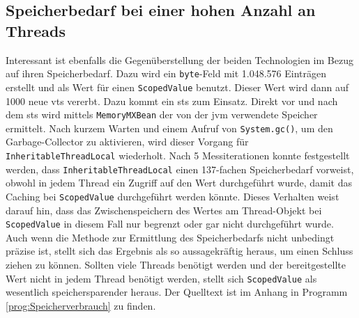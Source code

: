 \subsection{Speicherbedarf bei einer hohen Anzahl an Threads}
\label{sec:Speicherbedarf}

    Interessant ist ebenfalls die Gegenüberstellung der beiden Technologien im Bezug auf ihren Speicherbedarf. Dazu wird ein \texttt{byte}-Feld mit 1.048.576 Einträgen erstellt und als Wert für einen
    \texttt{ScopedValue} benutzt. Dieser Wert wird dann auf 1000 neue \Glspl{vt} vererbt. Dazu kommt ein \gls{sts} zum Einsatz. Direkt vor und nach dem \gls{sts} wird mittels 
    \texttt{MemoryMXBean} der von der \gls{jvm} verwendete Speicher ermittelt. Nach kurzem Warten und einem Aufruf von \texttt{System.gc()}, um den Garbage-Collector zu aktivieren, wird 
    dieser Vorgang für \texttt{InheritableThreadLocal} wiederholt. Nach 5 Messiterationen konnte festgestellt werden, dass \texttt{InheritableThreadLocal} einen 137-fachen Speicherbedarf 
    vorweist, obwohl in jedem Thread ein Zugriff auf den Wert durchgeführt wurde, damit das Caching bei \texttt{ScopedValue} durchgeführt werden könnte. Dieses Verhalten weist darauf hin, dass
    das Zwischenspeichern des Wertes am Thread-Objekt bei \texttt{ScopedValue} in diesem Fall nur begrenzt oder gar nicht durchgeführt wurde. Auch wenn die Methode zur Ermittlung des Speicherbedarfs 
    nicht unbedingt präzise ist, stellt sich das Ergebnis als so aussagekräftig heraus, um einen Schluss ziehen zu können. Sollten viele Threads benötigt werden und der bereitgestellte Wert 
    nicht in jedem Thread benötigt werden, stellt sich \texttt{ScopedValue} als wesentlich speichersparender heraus. Der Quelltext ist im Anhang in Programm \ref{prog:Speicherverbrauch} zu finden.
